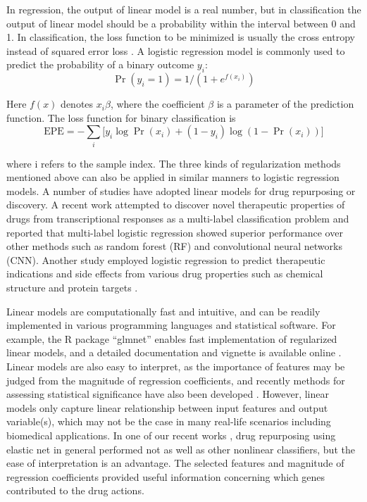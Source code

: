       In regression, the output of linear model is a real number, but in classification the output of linear model should be a probability within the interval between 0 and 1. In classification, the loss function to be minimized is usually the cross entropy instead of squared error loss \cite{bishop2006pattern}. A logistic regression model is commonly used to predict the probability of a binary outcome $y_i$:
      \begin{equation}
        \Pr(y_i = 1) = 1/(1 + e^{f(x_i)})
      \end{equation}

      Here $f(x)$ denotes $x_i \beta$, where the coefficient $\beta$ is a parameter of the prediction function. The loss function for binary classification is
      \begin{equation}
        \mathrm{EPE} = -\sum_i \bigg[ y_i \log \Pr(x_i) + (1 - y_i) \log (1 - \Pr(x_i)) \bigg]
      \end{equation}

      where i refers to the sample index. The three kinds of regularization methods mentioned above can also be applied in similar manners to logistic regression models.
      A number of studies have adopted linear models for drug repurposing or discovery. A recent work \cite{xie2017discovery} attempted to discover novel therapeutic properties of drugs from transcriptional responses as a multi-label classification problem and reported that multi-label logistic regression showed superior performance over other methods such as random forest (RF) and convolutional neural networks (CNN). Another study employed logistic regression to predict therapeutic indications and side effects from various drug properties such as chemical structure and protein targets \cite{wang2014exploring}.
    
      Linear models are computationally fast and intuitive, and can be readily implemented in various programming languages and statistical software. For example, the R package “glmnet” enables fast implementation of regularized linear models, and a detailed documentation and vignette is available online \cite{friedman2010regularization}. Linear models are also easy to interpret, as the importance of features may be judged from the magnitude of regression coefficients, and recently methods for assessing statistical significance have also been developed \cite{lockhart2014significance}. However, linear models only capture linear relationship between input features and output variable(s), which may not be the case in many real-life scenarios including biomedical applications. In one of our recent works \cite{zhao2018drug}, drug repurposing using elastic net in general performed not as well as other nonlinear classifiers, but the ease of interpretation is an advantage. The selected features and magnitude of regression coefficients provided useful information concerning which genes contributed to the drug actions.


